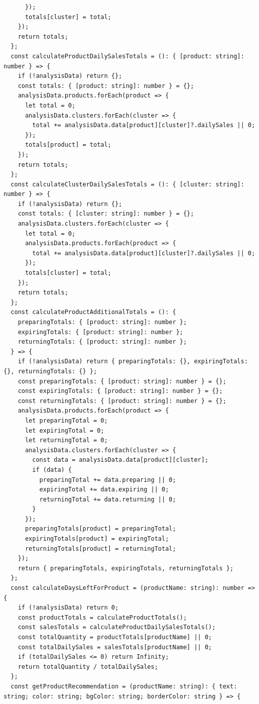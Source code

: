 \begin{code}
\begin{verbatim}
      });
      totals[cluster] = total;
    });
    return totals;
  };
  const calculateProductDailySalesTotals = (): { [product: string]: number } => {
    if (!analysisData) return {};
    const totals: { [product: string]: number } = {};
    analysisData.products.forEach(product => {
      let total = 0;
      analysisData.clusters.forEach(cluster => {
        total += analysisData.data[product][cluster]?.dailySales || 0;
      });
      totals[product] = total;
    });
    return totals;
  };
  const calculateClusterDailySalesTotals = (): { [cluster: string]: number } => {
    if (!analysisData) return {};
    const totals: { [cluster: string]: number } = {};
    analysisData.clusters.forEach(cluster => {
      let total = 0;
      analysisData.products.forEach(product => {
        total += analysisData.data[product][cluster]?.dailySales || 0;
      });
      totals[cluster] = total;
    });
    return totals;
  };
  const calculateProductAdditionalTotals = (): {
    preparingTotals: { [product: string]: number };
    expiringTotals: { [product: string]: number };
    returningTotals: { [product: string]: number };
  } => {
    if (!analysisData) return { preparingTotals: {}, expiringTotals: {}, returningTotals: {} };
    const preparingTotals: { [product: string]: number } = {};
    const expiringTotals: { [product: string]: number } = {};
    const returningTotals: { [product: string]: number } = {};
    analysisData.products.forEach(product => {
      let preparingTotal = 0;
      let expiringTotal = 0;
      let returningTotal = 0;
      analysisData.clusters.forEach(cluster => {
        const data = analysisData.data[product][cluster];
        if (data) {
          preparingTotal += data.preparing || 0;
          expiringTotal += data.expiring || 0;
          returningTotal += data.returning || 0;
        }
      });
      preparingTotals[product] = preparingTotal;
      expiringTotals[product] = expiringTotal;
      returningTotals[product] = returningTotal;
    });
    return { preparingTotals, expiringTotals, returningTotals };
  };
  const calculateDaysLeftForProduct = (productName: string): number => {
    if (!analysisData) return 0;
    const productTotals = calculateProductTotals();
    const salesTotals = calculateProductDailySalesTotals();
    const totalQuantity = productTotals[productName] || 0;
    const totalDailySales = salesTotals[productName] || 0;
    if (totalDailySales <= 0) return Infinity;
    return totalQuantity / totalDailySales;
  };
  const getProductRecommendation = (productName: string): { text: string; color: string; bgColor: string; borderColor: string } => {

\end{verbatim}
\end{code}
